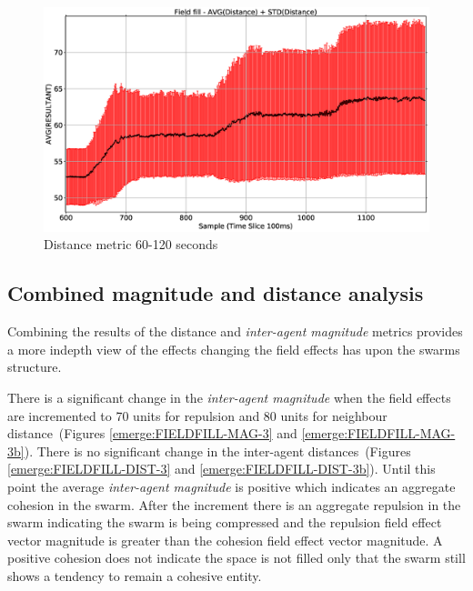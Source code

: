 \begin{figure}[H]
\begin{center}
\includegraphics[width=12cm]{CHAPTER-8/figures/FIELDFILL-DIST-2}
\end{center}
\caption{Distance metric 60-120 seconds\label{emerge:FIELDFILL-DIST-2}}
\end{figure}

\subsection{Combined magnitude and distance analysis}
Combining the results of the distance and \textit{inter-agent magnitude} metrics provides a more indepth view of the effects changing the field effects has upon the swarms structure.

There is a significant change in the \textit{inter-agent magnitude} when the field effects are incremented to 70 units for repulsion and 80 units for neighbour distance~(Figures \ref{emerge:FIELDFILL-MAG-3} and \ref{emerge:FIELDFILL-MAG-3b}). There is no significant change in the inter-agent distances~(Figures \ref{emerge:FIELDFILL-DIST-3} and \ref{emerge:FIELDFILL-DIST-3b}). Until this point the average \textit{inter-agent magnitude} is positive which indicates an aggregate cohesion in the swarm. After the increment there is an aggregate repulsion in the swarm indicating the swarm is being compressed and the repulsion field effect vector magnitude is greater than the cohesion field effect vector magnitude. A positive cohesion does not indicate the space is not filled only that the swarm still shows a tendency to remain a cohesive entity.

